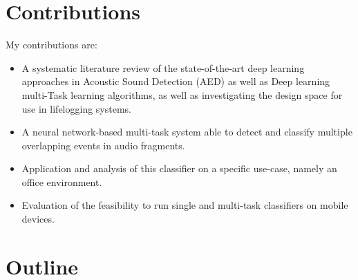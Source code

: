 



\section{Contributions}

My contributions are:

\begin{itemize}
	\item A systematic literature review of the state-of-the-art deep learning approaches in Acoustic Sound Detection (AED) as well as Deep learning multi-Task learning algorithms, as well as investigating the design space for use in lifelogging systems.
	\item A neural network-based multi-task system able to detect and classify multiple overlapping events in audio fragments.
	\item Application and analysis of this classifier on a specific use-case, namely an office environment.
	\item Evaluation of the feasibility to run single and multi-task classifiers on mobile devices. 
\end{itemize}
\section{Outline}




